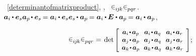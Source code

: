 \vspace{.1em}\noindent
{}
~\eqref{determinantofmatrixproduct},
,
~${\permutationsparitysymbols{i\hspace{-0.1ex}j\hspace{-0.1ex}k} \permutationsparitysymbols{pqr}}$.
%
\ru{\:---}
${\bm{a}_i \hspace{-0.1ex} \dotp \bm{e}_s \bm{a}_p \hspace{-0.2ex} \dotp \bm{e}_s \hspace{-0.2ex}
= \bm{a}_i \hspace{-0.1ex} \dotp \bm{e}_s \bm{e}_s \hspace{-0.2ex} \dotp \bm{a}_p \hspace{-0.15ex}
= \bm{a}_i \hspace{-0.1ex} \dotp \hspace{-0.1ex} \UnitDyad \dotp \bm{a}_p \hspace{-0.15ex}
= \bm{a}_i \hspace{-0.1ex} \dotp \bm{a}_p}$,

\nopagebreak\vspace{-0.2em}
\begin{equation*}
\permutationsparitysymbols{i\hspace{-0.1ex}j\hspace{-0.1ex}k} \permutationsparitysymbols{pqr} = \hspace{0.25ex}
\determinant\hspace{-0.1ex}
\scalebox{.92}{$\left[\hspace{-0.16ex}\begin{array}{c@{\hspace{.64em}}c@{\hspace{.64em}}c}
\bm{a}_i \narrowdotp\hspace{.12ex} \bm{a}_p & \bm{a}_i \narrowdotp\hspace{.12ex} \bm{a}_q & \bm{a}_i \narrowdotp\hspace{.12ex} \bm{a}_r \\
\bm{a}_j \narrowdotp\hspace{.12ex} \bm{a}_p & \bm{a}_j \narrowdotp\hspace{.12ex} \bm{a}_q & \bm{a}_j \narrowdotp\hspace{.12ex} \bm{a}_r \\
\bm{a}_k \narrowdotp\hspace{.12ex} \bm{a}_p & \bm{a}_k \narrowdotp\hspace{.12ex} \bm{a}_q & \bm{a}_k \narrowdotp\hspace{.12ex} \bm{a}_r
\end{array}\hspace{-0.12ex}\right]$} ;
\end{equation*}

